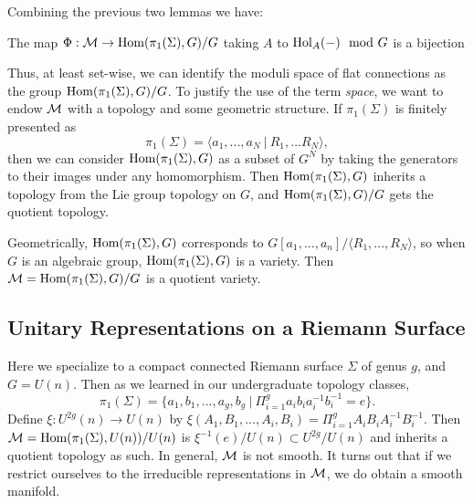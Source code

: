 	Combining the previous two lemmas we have:
	\begin{theorem}
		The map $\Phi:\mathcal{M} \to \text{Hom}(\pi_1(\Sigma), G)/G$ taking $A$ to $\text{Hol}_A(-) \mod G$ is a bijection
	\end{theorem}
	Thus, at least set-wise, we can identify the moduli space of flat connections as the group $\text{Hom}(\pi_1(\Sigma),G)/G$. To justify the use of the term \emph{space}, we want to endow $\mathcal{M}$ with a topology and some geometric structure. If $\pi_1(\Sigma)$ is finitely presented as
	\begin{equation}
		\pi_1(\Sigma) = \langle a_1,...,a_N ~|~ R_1,...R_N \rangle,
	\end{equation}
	then we can consider $\text{Hom}(\pi_1(\Sigma),G)$ as a subset of $G^N$ by taking the generators to their images under any homomorphism. Then $\text{Hom}(\pi_1(\Sigma),G)$ inherits a topology from the Lie group topology on $G$, and $\text{Hom}(\pi_1(\Sigma),G)/G$ gets the quotient topology. 
	
	Geometrically, $\text{Hom}(\pi_1(\Sigma),G)$ corresponds to $G[a_1,...,a_n]/\langle R_1,...,R_N\rangle$, so when $G$ is an algebraic group, $\text{Hom}(\pi_1(\Sigma),G)$ is a variety. Then $\mathcal{M} = \text{Hom}(\pi_1(\Sigma),G)/ G$ is a quotient variety.
	
	
	
	\subsection{Unitary Representations on a Riemann Surface}
	Here we specialize to a compact connected Riemann surface $\Sigma$ of genus $g$, and $G=U(n)$. Then as we learned in our undergraduate topology classes,
	\begin{equation}
		\pi_1(\Sigma) = \{a_1, b_1,...,a_g, b_g ~|~ \Pi_{i=1}^g a_ib_ia_i^{-1}b_i^{-1} = e
		\}.
	\end{equation}
	Define $\xi:U^{2g}(n)\to U(n)$ by $\xi(A_1,B_1,...,A_i,B_i)=\Pi_{i=1}^g A_iB_iA_i^{-1}B_i^{-1}$. Then $\mathcal{M} = \text{Hom}(\pi_1(\Sigma),U(n))/U(n)$ is $\xi^{-1}(e)/U(n)\subset U^{2g}/U(n)$ and inherits a quotient topology as such. In general, $\mathcal{M}$ is not smooth. It turns out that if we restrict ourselves to the irreducible representations in $\mathcal{M}$, we do obtain a smooth manifold. 

